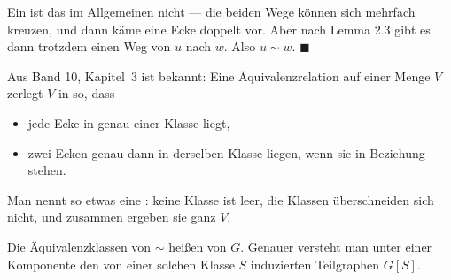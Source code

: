 \begin{merksatz}
Ein  ist das im Allgemeinen nicht --- die beiden Wege können sich mehrfach kreuzen, und dann käme eine Ecke doppelt vor. Aber nach Lemma 2.3 gibt es dann trotzdem einen Weg von $u$ nach $w$. Also $u \sim w$. $\blacksquare$

\begin{center}
\begin{minipage}{0.88\textwidth}
\end{minipage}
\end{center}
\end{merksatz}

\begin{merksatz}
Aus Band 10, Kapitel~3 ist bekannt: Eine Äquivalenzrelation auf einer Menge $V$ zerlegt $V$ in  so, dass
\begin{itemize}[leftmargin=1.4em, itemsep=2pt]
\item jede Ecke in genau einer Klasse liegt,
\item zwei Ecken genau dann in derselben Klasse liegen, wenn sie in Beziehung stehen.
\end{itemize}
Man nennt so etwas eine : keine Klasse ist leer, die Klassen überschneiden sich nicht, und zusammen ergeben sie ganz $V$.
\end{merksatz}

\begin{definition}
Die Äquivalenzklassen von $\sim$ heißen  von $G$. Genauer versteht man unter einer Komponente den von einer solchen Klasse $S$ induzierten Teilgraphen $G[S]$.
\end{definition}

